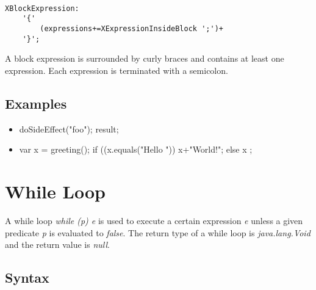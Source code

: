 \documentclass[a4paper,10pt]{scrreprt}
\newlength{\itemindentlen}
\begin{document}
\begin{lstlisting}

XBlockExpression:
	'{'
		(expressions+=XExpressionInsideBlock ';')+
	'}';

\end{lstlisting}
 

A block expression is surrounded by curly braces and contains at least one expression. Each expression is terminated with a semicolon.




\subsection{ Examples }


\setlength{\itemindentlen}{\textwidth}
\begin{itemize}
\addtolength{\itemindentlen}{-2em}

\item \begin{minipage}[t]{\itemindentlen}

	{
		doSideEffect("foo");
		result;
	}
	
\end{minipage}

\item \begin{minipage}[t]{\itemindentlen}

	{
		var x = greeting();
		if ((x.equals("Hello ")) {
			x+"World!"; 
		} else {
			x
		};
	}
	
\end{minipage}

\end{itemize}
\addtolength{\itemindentlen}{2em}







\section{While Loop}
\label{WhileExpression}

A while loop \emph{while (p) e} is used to execute a certain expression \emph{e} unless a given predicate \emph{p} is evaluated to \emph{false}.
The return type of a while loop is \emph{java.lang.Void} and the return value is \emph{null}.

\subsection{ Syntax }
\end{document}
